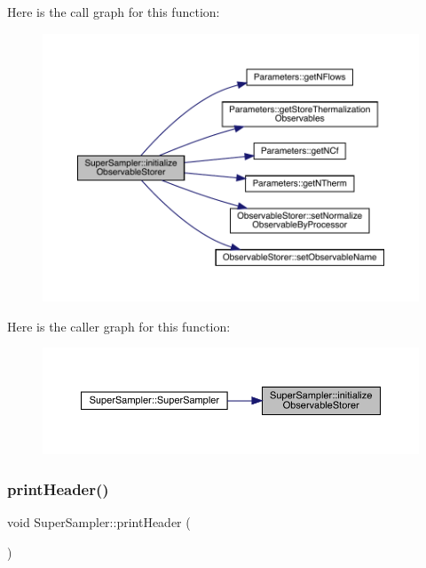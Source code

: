 Here is the call graph for this function\+:\nopagebreak
\begin{figure}[H]
\begin{center}
\leavevmode
\includegraphics[width=350pt]{class_super_sampler_a4429d6ae37247a02259bc0c6d665821c_cgraph}
\end{center}
\end{figure}
Here is the caller graph for this function\+:\nopagebreak
\begin{figure}[H]
\begin{center}
\leavevmode
\includegraphics[width=350pt]{class_super_sampler_a4429d6ae37247a02259bc0c6d665821c_icgraph}
\end{center}
\end{figure}
\mbox{\label{class_super_sampler_a9bedfcc40a22c48378a6ed63f64e6957}} 
\subsubsection{\texorpdfstring{printHeader()}{printHeader()}}
{\footnotesize\ttfamily void Super\+Sampler\+::print\+Header (\begin{DoxyParamCaption}{ }\end{DoxyParamCaption})\hspace{0.3cm}{\ttfamily [virtual]}}



